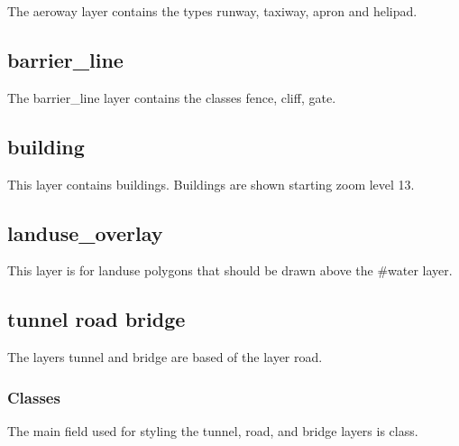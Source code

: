 The aeroway layer contains the types runway, taxiway, apron and helipad.

\subsection*{barrier\_line}\label{barrierux5fline}

The barrier\_line layer contains the classes fence, cliff, gate.

\subsection*{building}\label{building}

This layer contains buildings. Buildings are shown starting zoom level
13.

\subsection*{landuse\_overlay}\label{landuseux5foverlay}

This layer is for landuse polygons that should be drawn above the
\#water layer.

\subsection*{tunnel road bridge}\label{tunnel-road-bridge}

The layers tunnel and bridge are based of the layer road.

\subsubsection*{Classes}\label{classes}

The main field used for styling the tunnel, road, and bridge layers is class.

